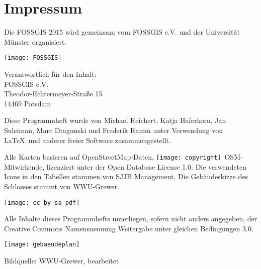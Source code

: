 
\newpage


\newpage
\section*{Impressum}
\label{impressum}
\vspace{-0.5em}


\begin{raggedright}
Die FOSSGIS 2015 wird gemeinsam vom FOSSGIS e.V. und der Universität Münster 
organisiert.

\vspace{0.5em}
	\texttt{[image: FOSSGIS]}

\vspace{0.5em}
\noindent Verantwortlich für den Inhalt:\\
FOSSGIS e.V.\\
Theodor-Echtermeyer-Straße 15\\
14469 Potsdam

\vspace{1em}
\noindent Diese Programmheft wurde von Michael Reichert, Katja Haferkorn, 
Jan Suleiman, Marc Dragunski und Frederik Ramm unter Verwendung von \LaTeX\ und anderer freier Software zusammengestellt. 

\vspace{0.5em}

\noindent Alle Karten basieren auf Open\-Street\-Map-Daten, 
\texttt{[image: copyright]}~OSM-Mitwirkende, lizenziert unter der Open Database License 1.0.
Die verwendeten Icons in den Tabellen stammen von SJJB Management. Die Gebäudeskizze des Schlosses stammt von WWU-Grewer.



\vspace{1em}
\noindent \begin{minipage}[htbp]{0.2\textwidth}
\noindent\texttt{[image: cc-by-sa-pdf]}
\end{minipage}
\hfill
\begin{minipage}[hbtp]{0.74\textwidth}\raggedright
Alle Inhalte dieses Programmhefts unterliegen, sofern nicht anders angegeben, 
der Creative Commons Namensnennung Weitergabe unter gleichen Bedingungen 3.0.
\end{minipage}
\end{raggedright}



\begin{landscape}
	\label{gebaeudeplan}
	\texttt{[image: gebaeudeplan]}
	
	Bildquelle: WWU-Grewer, bearbeitet
\end{landscape}

